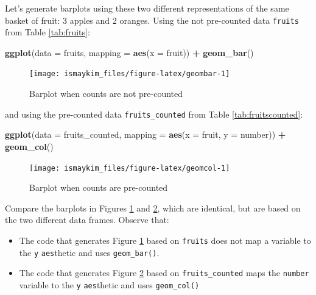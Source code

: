 \documentclass[12pt,]{krantz}
\makeatletter
\newenvironment{Shaded}{\begin{snugshade}}{\end{snugshade}}
\newcommand{\KeywordTok}[1]{\textcolor[rgb]{0.27,0.27,0.27}{\textbf{#1}}}
\newcommand{\DataTypeTok}[1]{\textcolor[rgb]{0.27,0.27,0.27}{#1}}
\newcommand{\StringTok}[1]{\textcolor[rgb]{0.5,0.5,0.5}{#1}}
\newcommand{\OperatorTok}[1]{\textcolor[rgb]{0.43,0.43,0.43}{\textbf{#1}}}
\newcommand{\NormalTok}[1]{#1}
\providecommand{\tightlist}{%
  \setlength{\itemsep}{0pt}\setlength{\parskip}{0pt}}
\newenvironment{kframe}{%
\medskip{}
\setlength{\fboxsep}{.8em}
 \def\at@end@of@kframe{}%
 \ifinner\ifhmode%
  \def\at@end@of@kframe{\end{minipage}}%
  \begin{minipage}{\columnwidth}%
 \fi\fi%
 \def\FrameCommand##1{\hskip\@totalleftmargin \hskip-\fboxsep
 \colorbox{shadecolor}{##1}\hskip-\fboxsep
     \hskip-\linewidth \hskip-\@totalleftmargin \hskip\columnwidth}%
 \MakeFramed {\advance\hsize-\width
   \@totalleftmargin\z@ \linewidth\hsize
   \@setminipage}}%
 {\par\unskip\endMakeFramed%
 \at@end@of@kframe}
\renewenvironment{Shaded}{\begin{kframe}}{\end{kframe}}
\theoremstyle{definition}
\theoremstyle{definition}
\theoremstyle{definition}
\theoremstyle{remark}
\makeatother
\begin{document}
Let's generate barplots using these two different representations of the
same basket of fruit: 3 apples and 2 oranges. Using the not pre-counted
data \texttt{fruits} from Table \ref{tab:fruits}:

\begin{Shaded}
\begin{Highlighting}[]
\KeywordTok{ggplot}\NormalTok{(}\DataTypeTok{data =}\NormalTok{ fruits, }\DataTypeTok{mapping =} \KeywordTok{aes}\NormalTok{(}\DataTypeTok{x =}\NormalTok{ fruit)) }\OperatorTok{+}
\StringTok{  }\KeywordTok{geom_bar}\NormalTok{()}
\end{Highlighting}
\end{Shaded}

\begin{figure}

{\centering \texttt{[image: ismaykim\_files/figure-latex/geombar-1]} 

}

\caption{Barplot when counts are not pre-counted}\label{fig:geombar}
\end{figure}

and using the pre-counted data \texttt{fruits\_counted} from Table
\ref{tab:fruitscounted}:

\begin{Shaded}
\begin{Highlighting}[]
\KeywordTok{ggplot}\NormalTok{(}\DataTypeTok{data =}\NormalTok{ fruits_counted, }\DataTypeTok{mapping =} \KeywordTok{aes}\NormalTok{(}\DataTypeTok{x =}\NormalTok{ fruit, }\DataTypeTok{y =}\NormalTok{ number)) }\OperatorTok{+}
\StringTok{  }\KeywordTok{geom_col}\NormalTok{()}
\end{Highlighting}
\end{Shaded}

\begin{figure}

{\centering \texttt{[image: ismaykim\_files/figure-latex/geomcol-1]} 

}

\caption{Barplot when counts are pre-counted}\label{fig:geomcol}
\end{figure}

Compare the barplots in Figures \ref{fig:geombar} and \ref{fig:geomcol},
which are identical, but are based on the two different data frames.
Observe that:

\begin{itemize}
\tightlist
\item
  The code that generates Figure \ref{fig:geombar} based on
  \texttt{fruits} does not map a variable to the \texttt{y}
  \texttt{aes}thetic and uses \texttt{geom\_bar()}.
\item
  The code that generates Figure \ref{fig:geomcol} based on
  \texttt{fruits\_counted} maps the \texttt{number} variable to the
  \texttt{y} \texttt{aes}thetic and uses \texttt{geom\_col()}
\end{itemize}
\end{document}
